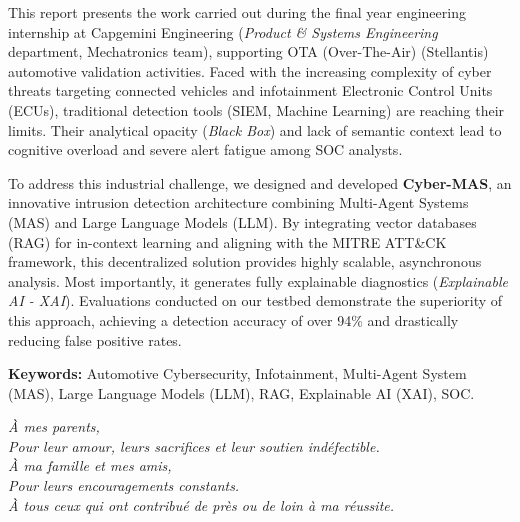 \documentclass[a4paper, 12pt]{report}
\begin{document}
This report presents the work carried out during the final year engineering internship at Capgemini Engineering (\textit{Product \& Systems Engineering} department, Mechatronics team), supporting OTA (Over-The-Air) (Stellantis) automotive validation activities. Faced with the increasing complexity of cyber threats targeting connected vehicles and infotainment Electronic Control Units (ECUs), traditional detection tools (SIEM, Machine Learning) are reaching their limits. Their analytical opacity (\textit{Black Box}) and lack of semantic context lead to cognitive overload and severe alert fatigue among SOC analysts.

To address this industrial challenge, we designed and developed \textbf{Cyber-MAS}, an innovative intrusion detection architecture combining Multi-Agent Systems (MAS) and Large Language Models (LLM). By integrating vector databases (RAG) for in-context learning and aligning with the MITRE ATT\&CK framework, this decentralized solution provides highly scalable, asynchronous analysis. Most importantly, it generates fully explainable diagnostics (\textit{Explainable AI - XAI}). Evaluations conducted on our testbed demonstrate the superiority of this approach, achieving a detection accuracy of over 94\% and drastically reducing false positive rates.

\vspace{0.5cm}
\noindent \textbf{Keywords:} Automotive Cybersecurity, Infotainment, Multi-Agent System (MAS), Large Language Models (LLM), RAG, Explainable AI (XAI), SOC.



\newpage
\thispagestyle{empty}
\vspace*{5cm}
\begin{flushright}
\textit{À mes parents,\\
Pour leur amour, leurs sacrifices et leur soutien indéfectible.\\
À ma famille et mes amis,\\
Pour leurs encouragements constants.\\
À tous ceux qui ont contribué de près ou de loin à ma réussite.}
\end{flushright}

\newpage
\thispagestyle{empty}
\end{document}
